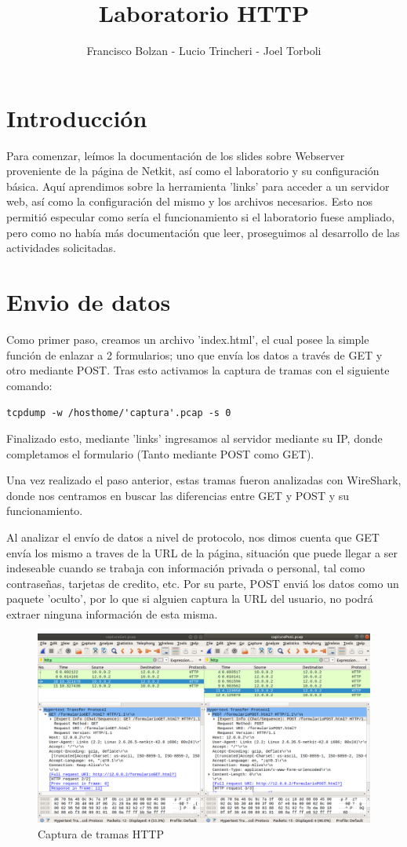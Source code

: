\documentclass[12pt,a4paper]{article}
\title{Laboratorio HTTP}
\author{Francisco Bolzan - Lucio Trincheri - Joel Torboli}
\begin{document}
	\maketitle
	\section{Introducción}
	Para comenzar, leímos la documentación de los slides sobre Webserver proveniente de la página de Netkit, así como el laboratorio y su configuración básica. Aquí aprendimos sobre la herramienta 'links' para acceder a un servidor web, así como la configuración del mismo y los archivos necesarios. Esto nos permitió especular como sería el funcionamiento si el laboratorio fuese ampliado, pero como no había más documentación que leer, proseguimos al desarrollo de las actividades solicitadas.
	\section{Envio de datos}
	Como primer paso, creamos un archivo 'index.html', el cual posee la simple función de enlazar a 2 formularios; uno que envía los datos a través de GET y otro mediante POST.
	Tras esto activamos la captura de tramas con el siguiente comando: 
	
	\verb|tcpdump -w /hosthome/'captura'.pcap -s 0| 
	
	Finalizado esto, mediante 'links' ingresamos al servidor mediante su IP, donde completamos el formulario (Tanto mediante POST como GET).
	
	Una vez realizado el paso anterior, estas tramas fueron analizadas con WireShark, donde nos centramos en buscar las diferencias entre GET y POST y su funcionamiento.
	
	Al analizar el envío de datos a nivel de protocolo, nos dimos cuenta que GET envía los mismo a traves de la URL de la página, situación que puede llegar a ser indeseable cuando se trabaja con información privada o personal, tal como contraseñas, tarjetas de credito, etc. Por su parte, POST enviá los datos como un paquete 'oculto', por lo que si alguien captura la URL del usuario, no podrá extraer ninguna información de esta misma.
	
	\begin{figure}[H]
		\includegraphics[width=\linewidth]{getvspost.png}
		\caption{Captura de tramas HTTP}
		\label{fig:boat1}
	\end{figure}
\end{document}
